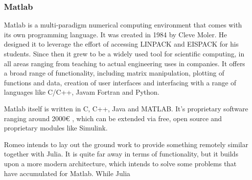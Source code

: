 \subsubsection{Matlab}

\ac{Matlab} is a multi-paradigm numerical computing environment that comes with its own programming language.
It was created in 1984 by Cleve Moler. He designed it to leverage the effort of accessing LINPACK and EISPACK for his students.
Since then it grew to be a widely used tool for scientific computing, in all areas ranging from teaching to actual engineering uses in companies.
It offers a broad range of functionality, including matrix manipulation, plotting of functions and data, creation of user interfaces and interfacing with a range of languages like C/C++, Javam Fortran and Python.

\ac{Matlab} itself is written in C, C++, Java and MATLAB.
It's proprietary software ranging around 2000€ \cite{MatlabPricing}, which can be extended via free, open source and proprietary modules like Simulink.

Romeo intends to lay out the ground work to provide something remotely similar together with Julia. It is quite far away in terms of functionality, but it builds upon a more modern architecture, which intends to solve some problems that have accumulated for Matlab.
While Julia 

